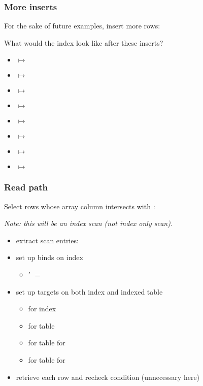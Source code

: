 \begin{frame}
  \frametitle{More inserts}
  For the sake of future examples, insert more rows:



  \pause

  What would the index look like after these inserts?
  \pause

  \begin{itemize}
    \item {} $\mapsto$ 
    \item {} $\mapsto$ 
    \item {} $\mapsto$ 
    \item {} $\mapsto$ 
    \item {} $\mapsto$ 
    \item {} $\mapsto$ 
    \item {} $\mapsto$ 
    \item {} $\mapsto$ 
  \end{itemize}
\end{frame}

\begin{frame}
  \frametitle{Read path}
  Select rows whose array column intersects with :

  \pause

  \emph{Note: this will be an index scan (not index only scan).}
  \pause

  \begin{itemize}
    \item extract scan entries: 
      \pause
    \item set up binds on index
      \begin{itemize}
        \item {}$'$ $=$ 
      \end{itemize}
      \pause
    \item set up targets on both index and indexed table
      \begin{itemize}
        \item {} for index
          \pause
        \item {} for table
          \pause
        \item {} for table for 
          \pause
        \item {} for table for 
      \end{itemize}
      \pause
    \item retrieve each row and recheck condition (unnecessary here)
  \end{itemize}
\end{frame}

